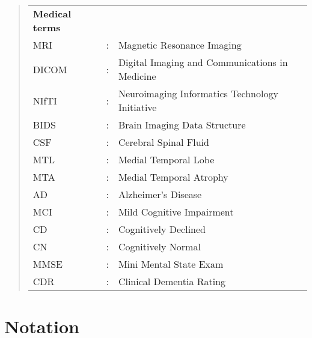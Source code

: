\documentclass[
    author={Kai Hulme},
    supervisor={Dr Jon Bird},
    degree={BSc},
    title={Generative Adversarial Networks as an Augmentation Technique},
    subtitle={for Alzheimer's Disease Detection in MRI Volumes},
    type={Research},
    year={2021} 
]{dissertation}
\begin{document}
\begin{quote}
\begin{tabular}{lcl}
\textbf{Medical terms}\\
MRI & : & Magnetic Resonance Imaging \\
DICOM & : & Digital Imaging and Communications in Medicine \\
NIfTI & : & Neuroimaging Informatics Technology Initiative \\
BIDS & : & Brain Imaging Data Structure \\
CSF & : & Cerebral Spinal Fluid \\
MTL & : & Medial Temporal Lobe \\
MTA & : & Medial Temporal Atrophy \\
AD & : & Alzheimer's Disease \\
MCI & : & Mild Cognitive Impairment \\
CD & : & Cognitively Declined \\
CN & : & Cognitively Normal \\
MMSE & : & Mini Mental State Exam \\
CDR & : & Clinical Dementia Rating \\

\end{tabular}
\end{quote}


\chapter*{Notation}
\end{document}
